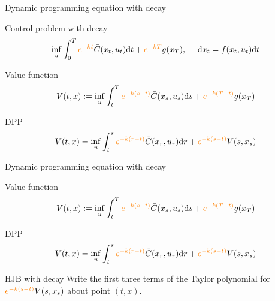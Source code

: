 \documentclass[color=usenames,dvipsnames]{beamer}
\newcommand{\dt}{\text{\normalfont d}t}
\newcommand{\ds}{\text{\normalfont d}s}
\newcommand{\dr}{\text{\normalfont d}r}
\newcommand{\dx}{\text{\normalfont d}x}
\begin{document}

\begin{frame}{Dynamic programming equation with decay}
    \begin{block}
        {Control problem with decay}
        \[
        \inf_{u}\int_0^T {\color{orange}e^{-kt}}\bar{C}(x_t,u_t)\dt+{\color{orange}e^{-kT}}g(x_T),~~~~\dx_t = f(x_t,u_t)\dt
        \]
    \end{block}
    \begin{block}
        {Value function}
        \[
        V(t,x):=\inf_{u}\int_t^T {\color{orange}e^{-k(s-t)}}\bar{C}(x_s,u_s)\ds + {\color{orange}e^{-k(T-t)}}g(x_T)
        \]
    \end{block}
    \begin{block}
        {DPP}
        \[
        V(t,x)=\inf_{u}\int_t^s {\color{orange}e^{-k(r-t)}}\bar{C}(x_r,u_r)\dr + {\color{orange}e^{-k(s-t)}}V(s,x_s)
        \]
    \end{block}
\end{frame}

\begin{frame}{Dynamic programming equation with decay}
    \begin{block}
        {Value function}
        \[
        V(t,x):=\inf_{u}\int_t^T {\color{orange}e^{-k(s-t)}}\bar{C}(x_s,u_s)\ds + {\color{orange}e^{-k(T-t)}}g(x_T)
        \]
    \end{block}
    \begin{block}
        {DPP}
        \[
        V(t,x)=\inf_{u}\int_t^s {\color{orange}e^{-k(r-t)}}\bar{C}(x_r,u_r)\dr + {\color{orange}e^{-k(s-t)}}V(s,x_s)
        \]
    \end{block}
        \begin{block}
        {HJB with decay}
        Write the first three terms of the Taylor polynomial for ${\color{orange}e^{-k(s-t)}}V(s,x_s)$ about point $(t,x)$.
    \end{block}
\end{frame}
\end{document}
